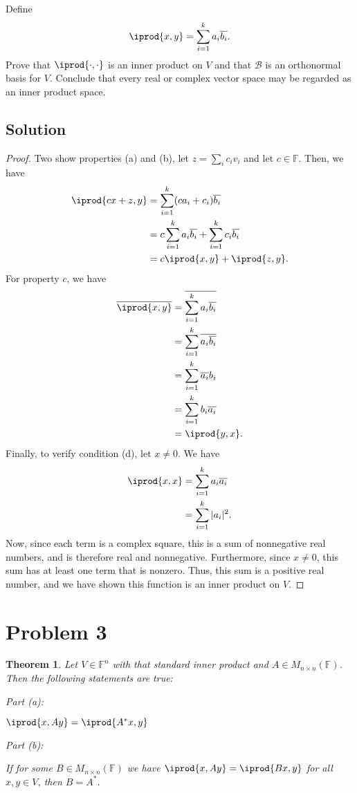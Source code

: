 \documentclass[10pt,a4paper]{article}
\makeatletter
\newtheorem{theorem}{Theorem}
\newcommand{\proofpart}[2]{%
  \par
  \addvspace{\medskipamount}%
  \noindent\emph{Part #1: #2}\par\nobreak
  \addvspace{\smallskipamount}%
  \@afterheading
}
\theoremstyle{definition}
\newcommand{\F}{\mathbb{F}}
\newcommand{\B}{\mathcal{B}}
\makeatother
\begin{document}
Define 
\[\iprod{x, y}= \sum_{i =1}^k a_i \overline{b_i}.\]
Prove that $\iprod{\cdot,\cdot}$ is an inner product on $V$ and that $\B$ is an orthonormal basis for $V$. Conclude that every real or complex vector space may be regarded as an inner product space.

\subsection*{Solution}
\begin{proof}
Two show properties (a) and (b), let $z = \sum_i c_i v_i$ and let $c \in \F$. Then, we have
\begin{align*}
\iprod{cx + z, y} &= \sum_{i =1}^k (ca_i + c_i)\overline{b_i}\\
&= c\sum_{i =1}^k a_i\overline{b_i} + \sum_{i =1}^k c_i\overline{b_i}\\
&= c \iprod{x, y} + \iprod{z, y}.
\end{align*}
For property $c$, we have 
\begin{align*}
\overline{\iprod{x, y}} &= \overline{\sum_{i =1}^k a_i \overline{b_i}}\\
&= \sum_{i =1}^k \overline{a_i \overline{b_i}}\\
&= \sum_{i =1}^k \overline{a_i} b_i\\
&= \sum_{i =1}^k b_i \overline{a_i}\\
&= \iprod{y, x}.
\end{align*}
Finally, to verify condition (d), let $x \not = 0$. We have
\begin{align*}
\iprod{x,x} &= \sum_{i =1}^k a_i \overline{a_i}\\
&= \sum_{i =1}^k |a_i|^2.
\end{align*}
Now, since each term is a complex square, this is a sum of nonnegative real numbers, and is therefore real and nonnegative. Furthermore, since $x \not = 0$, this sum has at least one term that is nonzero. Thus, this sum is a positive real number, and we have shown this function is an inner product on $V$.
\end{proof}

\section*{Problem 3}
\begin{theorem}
Let $V \in \F^n$ with that standard inner product and $A \in M_{n \times n}(\F)$. Then the following statements are true:
\proofpart{(a)}{} $\iprod{x, Ay} = \iprod{A^* x, y}$

\proofpart{(b)}{} If for some $B \in M_{n \times n}(\F)$ we have $\iprod{x, Ay} = \iprod{B x, y}$ for all $x, y \in V$, then $B = A^*$.
\end{theorem}
\end{document}
